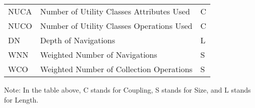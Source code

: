 \begin{table}[ht]
\begin{threeparttable}
\begin{tabular}{@{}lll@{}}
NUCA                                                      & Number of Utility Classes Attributes Used                                                                          & C                                                                \\
NUCO                                                      & Number of Utility Classes Operations Used                                                                          & C                                                                \\
DN                                                        & Depth of Navigations                                                                                               & L                                                                \\
WNN                                                       & Weighted Number of Navigations                                                                                     & S                                                                \\
WCO                                                       & Weighted Number of Collection Operations                                                                           & S                                                                \\ \bottomrule
\end{tabular}
\begin{tablenotes}
    \small
    \item Note: In the table above, C stands for Coupling, S stands for Size, and L stands for Length.
\end{tablenotes}
\end{threeparttable} 
\end{table}

